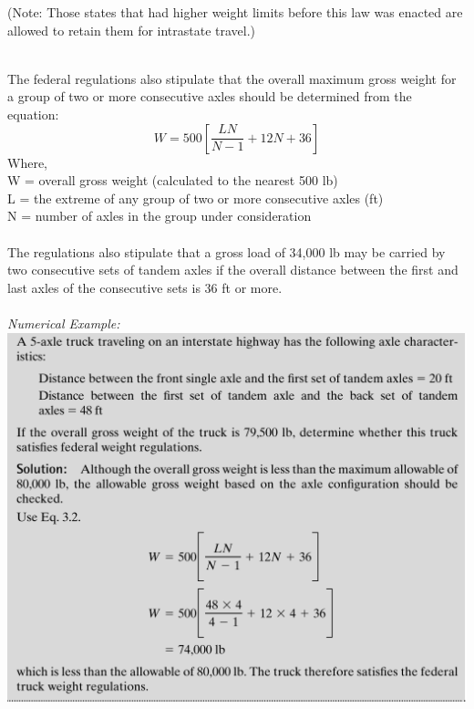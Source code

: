 %
(Note: Those states that had higher weight limits before this law was enacted are allowed to retain them for intrastate travel.)
\\\\
\par
The federal regulations also stipulate that the overall maximum gross weight for a group of two or more consecutive axles should be determined from the equation:
\begin{equation}
	W = 500\left[\frac{LN}{N-1} + 12N + 36\right]
\end{equation}
Where,\\
\hspace*{10mm}W = overall gross weight (calculated to the nearest 500 lb)\\
\hspace*{10mm}L = the extreme of any group of two or more consecutive axles (ft)\\
\hspace*{10mm}N = number of axles in the group under consideration\\\\
%
The regulations also stipulate that a gross load of 34,000 lb may be carried by two consecutive sets of tandem axles if the overall distance between the first and last axles of the consecutive sets is 36 ft or more.
\\\\
\emph{Numerical Example:}
\\
\includegraphics{gfx/fig6.png}
\\\\
